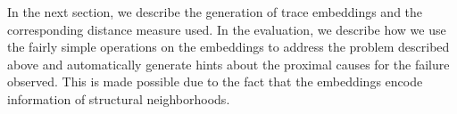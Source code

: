 In the next section, we describe the generation of trace embeddings and the corresponding distance measure used. In the evaluation, we describe how we use the fairly simple operations on the embeddings to address the problem described above and automatically generate hints about the proximal causes for the failure observed. This is made possible due to the fact that the embeddings encode information of structural neighborhoods.
